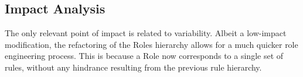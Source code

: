 \subsection{Impact Analysis}\label{sec:fa_roles_impact_analysis}

The only relevant point of impact is related to variability. Albeit a low-impact modification, the refactoring of the Roles hierarchy allows for a much quicker role engineering process. This is because a Role now corresponds to a single set of rules, without any hindrance resulting from the previous rule hierarchy.




